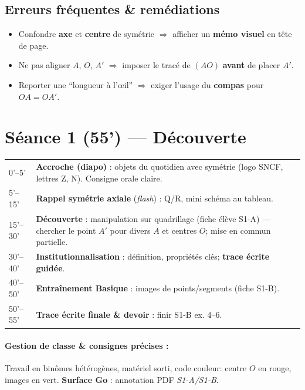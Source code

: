 \subsection*{Erreurs fréquentes \& remédiations}
\begin{itemize}
	\item Confondre \textbf{axe} et \textbf{centre} de symétrie $\Rightarrow$ afficher un \textbf{mémo visuel} en tête de page.
	\item Ne pas aligner $A$, $O$, $A'$ $\Rightarrow$ imposer le tracé de $(AO)$ \textbf{avant} de placer $A'$.
	\item Reporter une ``longueur à l’œil'' $\Rightarrow$ exiger l’usage du \textbf{compas} pour $OA=OA'$.
\end{itemize}

\section*{Séance 1 (55') — Découverte}
\begin{tcolorbox}[title=Plan minute par minute]
	\begin{tabular}{p{2.5cm} p{12.5cm}}
		0'–5' & \textbf{Accroche (diapo)} : objets du quotidien avec symétrie (logo SNCF, lettres Z, N). Consigne orale claire.\\
		5'–15' & \textbf{Rappel symétrie axiale} (\textit{flash}) : Q/R, mini schéma au tableau. \\
		15'–30' & \textbf{Découverte} : manipulation sur quadrillage (fiche élève S1-A) — chercher le point $A'$ pour divers $A$ et centres $O$; mise en commun partielle. \\
		30'–40' & \textbf{Institutionnalisation} : définition, propriétés clés; \textbf{trace écrite guidée}. \\
		40'–50' & \textbf{Entraînement Basique} : images de points/segments (fiche S1-B). \\
		50'–55' & \textbf{Trace écrite finale \& devoir} : finir S1-B ex. 4–6. 
	\end{tabular}
\end{tcolorbox}

\paragraph{Gestion de classe \& consignes précises :}
Travail en binômes hétérogènes, matériel sorti, code couleur: centre $O$ en rouge, images en vert. \textbf{Surface Go} : annotation PDF \textit{S1-A/S1-B}. 

